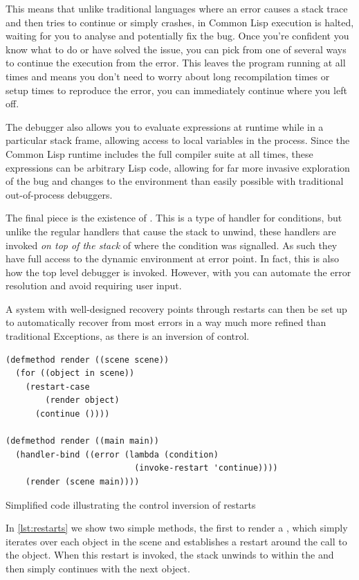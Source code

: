 \documentclass[a4paper]{paper}
\begin{document}
This means that unlike traditional languages where an error causes a stack trace and then tries to continue or simply crashes, in Common Lisp execution is halted, waiting for you to analyse and potentially fix the bug. Once you're confident you know what to do or have solved the issue, you can pick from one of several ways to continue the execution from the error. This leaves the program running at all times and means you don't need to worry about long recompilation times or setup times to reproduce the error, you can immediately continue where you left off.

The debugger also allows you to evaluate expressions at runtime while in a particular stack frame, allowing access to local variables in the process. Since the Common Lisp runtime includes the full compiler suite at all times, these expressions can be arbitrary Lisp code, allowing for far more invasive exploration of the bug and changes to the environment than easily possible with traditional out-of-process debuggers.

The final piece is the existence of . This is a type of handler for conditions, but unlike the regular handlers that cause the stack to unwind, these handlers are invoked \textit{on top of the stack} of where the condition was signalled. As such they have full access to the dynamic environment at error point. In fact, this is also how the top level debugger is invoked. However, with  you can automate the error resolution and avoid requiring user input.

A system with well-designed recovery points through restarts can then be set up to automatically recover from most errors in a way much more refined than traditional Exceptions, as there is an inversion of control.

\begin{listing}[H]
\begin{verbatim}
(defmethod render ((scene scene))
  (for ((object in scene))
    (restart-case
        (render object)
      (continue ())))

(defmethod render ((main main))
  (handler-bind ((error (lambda (condition)
                          (invoke-restart 'continue))))
    (render (scene main))))
\end{verbatim}
\caption{Simplified code illustrating the control inversion of restarts}
\label{lst:restarts}
\end{listing}

In \autoref{lst:restarts} we show two simple methods, the first to render a , which simply iterates over each object in the scene and establishes a  restart around the call to  the object. When this restart is invoked, the stack unwinds to within the  and then simply continues with the next object.
\end{document}
